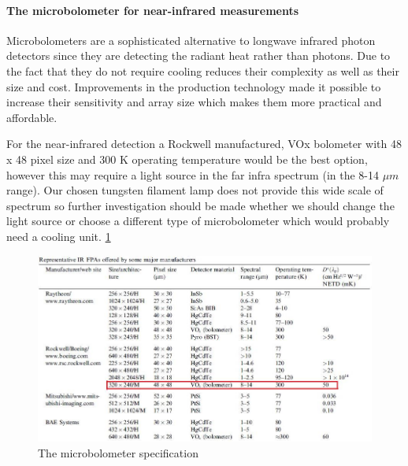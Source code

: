 \paragraph{The microbolometer for near-infrared measurements}
Microbolometers are a sophisticated alternative to longwave infrared photon detectors since they are detecting the radiant heat rather than photons. Due to the fact that they do not require cooling reduces their complexity as well as their size and cost. Improvements in the production technology made it possible to increase their sensitivity and array size which makes them more practical and affordable.

For the near-infrared detection a Rockwell manufactured, VOx bolometer with 48 x 48 pixel size and 300 K operating temperature would be the best option, however this may require a light source in the far infra spectrum (in the 8-14 $\mu m$ range). Our chosen tungsten filament lamp does not provide this wide scale of spectrum so further investigation should be made whether we should change the light source or choose a different type of microbolometer which would probably need a cooling unit. 
\ref{fig:Microbolometer}

\begin{figure}[htb]
  \centering
  \includegraphics[scale=0.6]{figures/BFfig/Microbolometer}
  \caption{The microbolometer specification \cite{Rogalski2002187}}
  \label{fig:Microbolometer}
\end{figure}
